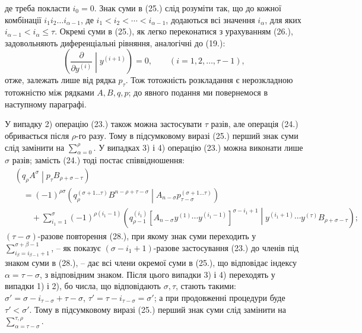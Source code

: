 \documentclass[11pt]{article}
\newcommand{\pair}[2]{\left(#1\middle|#2\right)}
\begin{document}
де треба покласти $i_0=0$. Знак суми в (25.) слід розуміти так, що до кожної комбінації $i_1i_2\ldots i_{\alpha-1}$, де $i_1<i_2<\cdots<i_{\alpha-1}$, додаються всі значення $i_\alpha$, для яких $i_{\alpha-1}<i_\alpha\le\tau$. Окремі суми в (25.), як легко переконатися з урахуванням (26.), задовольняють диференціальні рівняння, аналогічні до (19.):
\begin{equation}
 \left(\frac{\partial}{\partial y^{(i)}}\middle|y^{(i+1)}\right)=0,
 \qquad (i=1,2,\ldots,\tau-1),
\tag{27}
\end{equation}
отже, залежать лише від рядка $p_\tau$. Тож тотожність розкладання є нерозкладною тотожністю між рядками $A,B,q,p$; до явного подання ми повернемося в наступному параграфі.

У випадку 2) операцію (23.) також можна застосувати $\tau$ разів, але операція (24.) обривається після $\rho$-го разу. Тому в підсумковому виразі (25.) перший знак суми слід замінити на $\sum_{\alpha=0}^{\rho}$. У випадках 3) і 4) операцію (23.) можна виконати лише $\sigma$ разів; замість (24.) тоді постає співвідношення:
\begin{equation}
\begin{aligned}
&\pair{q_\rho A^\sigma}{p_\tau B_{\rho+\sigma-\tau}}\\
&\quad=(-1)^{\rho\sigma}
\pair{q_\rho^{(\sigma+1\ldots\tau)}B^{n-\rho+\tau-\sigma}}
{A_{n-\sigma}p_{\tau-\sigma}^{(\sigma+1\ldots\tau)}}\\
&\qquad+\sum_{i_1=1}^{\sigma}(-1)^{\rho(i_1-1)}
\pair{q_{\rho-1}^{(i_1)}
[A_{n-\sigma}y^{(1)}\cdots y^{(i_1-1)}]^{\sigma-i_1+1}}
{y^{(i_1+1)}\cdots y^{(\tau)}B_{\rho+\sigma-\tau}};
\end{aligned}
\tag{28}
\end{equation}
$(\tau-\sigma)$-разове повторення (28.), при якому знак суми переходить у $\sum_{i_\beta=i_{\beta-1}+1}^{\sigma+\beta-1}$, -- як показує $(\sigma-i_1+1)$-разове застосування (23.) до членів під знаком суми в (28.), -- дає всі члени окремої суми в (25.), що відповідає індексу $\alpha=\tau-\sigma$, з відповідним знаком. Після цього випадки 3) і 4) переходять у випадки 1) і 2), бо числа, що відповідають $\sigma,\tau$, стають такими: $\sigma'=\sigma-i_{\tau-\sigma}+\tau-\sigma$, $\tau'=\tau-i_{\tau-\sigma}=\sigma'$; а при продовженні процедури буде $\tau'<\sigma'$. Тому в підсумковому виразі (25.) перший знак суми слід замінити на $\sum_{\alpha=\tau-\sigma}^{\tau,\rho}$.
\end{document}
